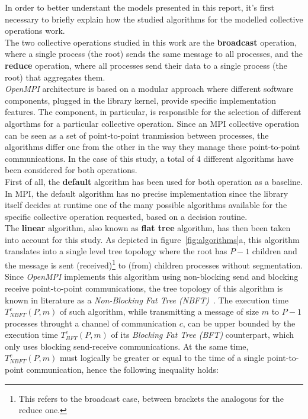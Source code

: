 \documentclass[../main.tex]{subfiles}
\begin{document}
In order to better understant the models presented in this report, it's first necessary to briefly explain how the studied algorithms for the modelled collective operations work.\\
The two collective operations studied in this work are the \textbf{broadcast} operation, where a single process (the root) sends the same message to all processes, and the \textbf{reduce} operation, where all processes send their data to a single process (the root) that aggregates them.\\
\textit{OpenMPI} architecture is based on a modular approach where different software components, plugged in the library kernel, provide specific implementation features. The  component, in particular, is responsible for the selection of different algorthms for a particular collective operation. Since an MPI collective operation can be seen as a set of point-to-point tranmission between processes, the algorithms differ one from the other in the way they manage these point-to-point communications. In the case of this study, a total of $4$ different algorithms have been considered for both operations.\\
First of all, the \textbf{default} algorithm has been used for both operation as a baseline. In MPI, the default algorithm has no precise implementation since the library itself decides at runtime one of the many possible algorithms available for the specific collective operation requested, based on a decision routine.\\
The \textbf{linear} algorithm, also known as \textbf{flat tree} algorithm, has then been taken into account for this study. As depicted in figure~\ref{fig:algorithms}a, this algorithm translates into a single level tree topology where the root has $P-1$ children and the message is sent (received)\footnote{This refers to the broadcast case, between brackets the analogous for the reduce one.} to (from) children processes without segmentation.
Since \textit{OpenMPI} implements this algorithm using non-blocking send and blocking receive point-to-point communications, the tree topology of this algorithm is known in literature as a \textit{Non-Blocking Fat Tree (NBFT)}~\cite{Nuriyev2022}. The execution time $T^{c}_{NBFT}(P,m)$ of such algorithm, while transmitting a message of size $m$ to $P-1$ processes throught a channel of communication $c$, can be upper bounded by the execution time $T^{c}_{BFT}(P,m)$ of its \textit{Blocking Fat Tree (BFT)} counterpart, which only uses blocking send-receive communications. At the same time, $T^{c}_{NBFT}(P,m)$ must logically be greater or equal to the time of a single point-to-point communication, hence the following inequality holds:
\end{document}
